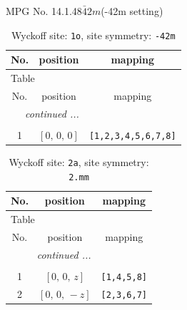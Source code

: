 \documentclass[fleqn,8pt]{jsarticle}
\begin{document}
\setcounter{MaxMatrixCols}{32}

\renewcommand{\tablename}{Table~}
\renewcommand{\figurename}{Figure~}
\begin{center}
\LARGE
MPG No. 14.1.48\quad$\bar{4}2m$\quad(-42m setting)
\end{center}
\renewcommand{\arraystretch}{1.2}
\begin{longtable}{ccc}
\caption{Wyckoff site: {\tt 1o}, site symmetry: {\tt -42m}}
 \\
 \hline \hline
No. & position & mapping \\ \hline \endfirsthead

\multicolumn{2}{l}{\tablename\ \thetable{}} \\
 \hline \hline
No. & position & mapping \\ \hline \endhead

 \hline \hline
\multicolumn{2}{r}{\footnotesize\it continued ...} \\ \endfoot

 \hline \hline
\multicolumn{2}{r}{} \\ \endlastfoot

1 & $\left[ 0,\, 0,\, 0 \right]$ & {\tt [1,2,3,4,5,6,7,8]} \\
\end{longtable}
\renewcommand{\arraystretch}{1.2}
\begin{longtable}{ccc}
\caption{Wyckoff site: {\tt 2a}, site symmetry: {\tt 2.mm}}
 \\
 \hline \hline
No. & position & mapping \\ \hline \endfirsthead

\multicolumn{2}{l}{\tablename\ \thetable{}} \\
 \hline \hline
No. & position & mapping \\ \hline \endhead

 \hline \hline
\multicolumn{2}{r}{\footnotesize\it continued ...} \\ \endfoot

 \hline \hline
\multicolumn{2}{r}{} \\ \endlastfoot

1 & $\left[ 0,\, 0,\, z \right]$ & {\tt [1,4,5,8]} \\ \hline
2 & $\left[ 0,\, 0,\, - z \right]$ & {\tt [2,3,6,7]} \\
\end{longtable}
\renewcommand{\arraystretch}{1.2}
\end{document}
